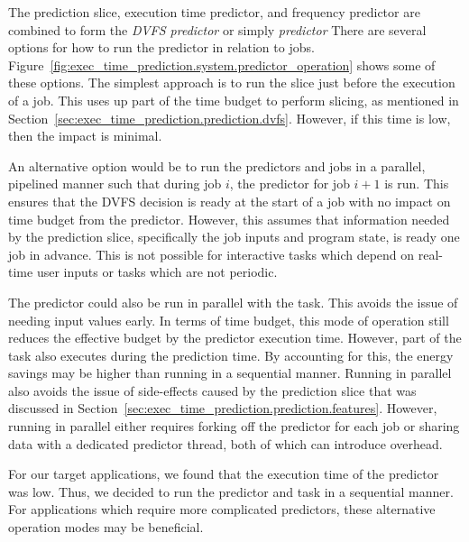 The prediction slice, execution time predictor, and frequency predictor are
combined to form the \emph{DVFS predictor} or simply \emph{predictor} There are
several options for how to run the predictor in relation to jobs.
Figure~\ref{fig:exec_time_prediction.system.predictor_operation} shows some of
these options.  The simplest approach is to run the slice just before the
execution of a job. This uses up part of the time budget to perform slicing, as
mentioned in Section~\ref{sec:exec_time_prediction.prediction.dvfs}. However,
if this time is low, then the impact is minimal.

An alternative option would be to run the predictors and jobs in a parallel,
pipelined manner such that during job $i$, the predictor for job $i+1$ is run.
This ensures that the DVFS decision is ready at the start of a job with no
impact on time budget from the predictor.  However, this assumes that
information needed by the prediction slice, specifically the job inputs and
program state, is ready one job in advance. This is not possible for
interactive tasks which depend on real-time user inputs or tasks which are not
periodic.

The predictor could also be run in parallel with the task. This avoids the
issue of needing input values early. In terms of time budget, this mode of
operation still reduces the effective budget by the predictor execution time.
However, part of the task also executes during the prediction time. By
accounting for this, the energy savings may be higher than running in a
sequential manner. Running in parallel also avoids the issue of side-effects
caused by the prediction slice that was discussed in
Section~\ref{sec:exec_time_prediction.prediction.features}. However, running in
parallel either requires forking off the predictor for each job or sharing data
with a dedicated predictor thread, both of which can introduce overhead.

For our target applications, we found that the execution time of the predictor
was low. Thus, we decided to run the predictor and task in a sequential manner.
For applications which require more complicated predictors, these alternative
operation modes may be beneficial.
